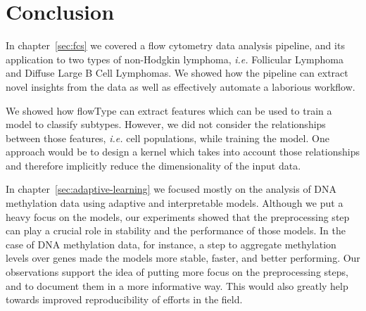 \chapter{Conclusion}
In chapter~\ref{sec:fcs} we covered a flow cytometry data analysis pipeline, and
its application to two types of non-Hodgkin lymphoma, \emph{i.e.} Follicular
Lymphoma and Diffuse Large B Cell Lymphomas. We showed how the pipeline can
extract novel insights from the data as well as effectively automate a laborious
workflow.

We showed how flowType can extract features which can be used to train a model
to classify subtypes. However, we did not consider the relationships between
those features, \emph{i.e.} cell populations, while training the model. One
approach would be to design a kernel which takes into account those
relationships and therefore implicitly reduce the dimensionality of the input
data.

In chapter~\ref{sec:adaptive-learning} we focused mostly on the analysis of DNA
methylation data using adaptive and interpretable models. Although we put a
heavy focus on the models, our experiments showed that the preprocessing step
can play a crucial role in stability and the performance of those models. In the
case of DNA methylation data, for instance, a step to aggregate methylation
levels over genes made the models more stable, faster, and better performing.
Our observations support the idea of putting more focus on the preprocessing
steps, and to document them in a more informative way. This would also greatly
help towards improved reproducibility of efforts in the field.

